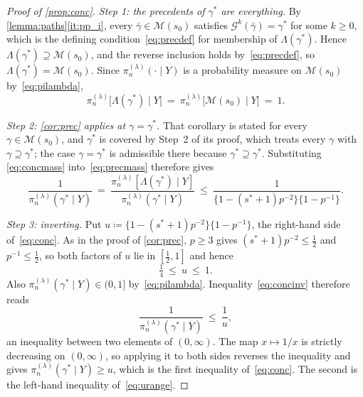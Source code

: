 \begin{proof}[Proof of \cref{prop:conc}]
    \emph{Step 1: the precedents of $\gamma^{\ast}$ are everything.} By
    \cref{lemma:paths}\ref{it:pp_i}, every $\bar\gamma\in\mathscr{M}(s_0)$
    satisfies $\mathcal{G}^{k}(\bar\gamma)=\gamma^{\ast}$ for some
    $k\geq0$, which is the defining condition~\eqref{eq:precdef} for
    membership of $\Lambda(\gamma^{\ast})$. Hence
    $\Lambda(\gamma^{\ast})\supseteq\mathscr{M}(s_0)$, and the reverse
    inclusion holds by~\eqref{eq:precdef}, so
    $\Lambda(\gamma^{\ast})=\mathscr{M}(s_0)$. Since
    $\pi_n^{(\lambda)}(\cdot\mid Y)$ is a probability measure on
    $\mathscr{M}(s_0)$ by~\eqref{eq:pilambda},
    \begin{equation}
        \label{eq:concmass}
        \pi_n^{(\lambda)}\bigl[\Lambda(\gamma^{\ast})\mid Y\bigr]
        \ =\ \pi_n^{(\lambda)}\bigl[\mathscr{M}(s_0)\mid Y\bigr]
        \ =\ 1 .
    \end{equation}

    \emph{Step 2: \cref{cor:prec} applies at $\gamma=\gamma^{\ast}$.}
    That corollary is stated for every $\gamma\in\mathscr{M}(s_0)$, and
    $\gamma^{\ast}$ is covered by Step~2 of its proof, which treats every
    $\gamma$ with $\gamma\supseteq\gamma^{\ast}$; the case
    $\gamma=\gamma^{\ast}$ is admissible there because
    $\gamma^{\ast}\supseteq\gamma^{\ast}$. Substituting
    \eqref{eq:concmass} into~\eqref{eq:precmass} therefore gives
    \begin{equation}
        \label{eq:concinv}
        \frac{1}{\pi_n^{(\lambda)}(\gamma^{\ast}\mid Y)}
        \ =\ \frac{\pi_n^{(\lambda)}[\Lambda(\gamma^{\ast})\mid Y]}
        {\pi_n^{(\lambda)}(\gamma^{\ast}\mid Y)}
        \ \leq\ \frac{1}
        {\bigl\{1-(s^{\ast}+1)p^{-2}\bigr\}
        \bigl\{1-p^{-1}\bigr\}} .
    \end{equation}

    \emph{Step 3: inverting.} Put
    $u\coloneq\bigl\{1-(s^{\ast}+1)p^{-2}\bigr\}
    \bigl\{1-p^{-1}\bigr\}$, the right-hand side
    of~\eqref{eq:conc}. As in the proof of \cref{cor:prec},
    $p\geq3$ gives $(s^{\ast}+1)p^{-2}\leq\tfrac12$ and
    $p^{-1}\leq\tfrac12$, so both factors
    of $u$ lie in $[\tfrac12,1]$ and hence
    \begin{equation}
        \label{eq:urange}
        \tfrac14\ \leq\ u\ \leq\ 1 .
    \end{equation}
    Also $\pi_n^{(\lambda)}(\gamma^{\ast}\mid Y)\in(0,1]$
    by~\eqref{eq:pilambda}. Inequality~\eqref{eq:concinv} therefore reads
    \begin{equation*}
        \frac{1}{\pi_n^{(\lambda)}(\gamma^{\ast}\mid Y)}
        \ \leq\ \frac{1}{u},
    \end{equation*}
    an inequality between two elements of $(0,\infty)$. The map
    $x\mapsto1/x$ is strictly decreasing on $(0,\infty)$, so applying it
    to both sides reverses the inequality and gives
    $\pi_n^{(\lambda)}(\gamma^{\ast}\mid Y)\geq u$, which is the first
    inequality of~\eqref{eq:conc}. The second is the left-hand
    inequality of~\eqref{eq:urange}.
\end{proof}

